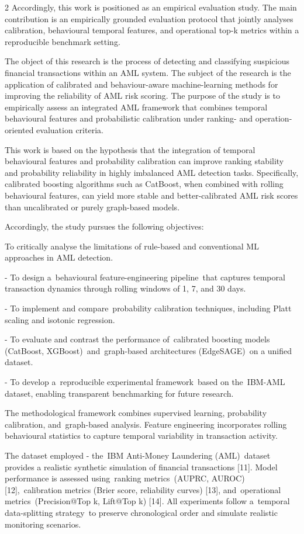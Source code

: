 \begin{multicols}{2}
Accordingly, this work is positioned as an empirical evaluation study.
The main contribution is an empirically grounded evaluation protocol
that jointly analyses calibration, behavioural temporal features, and
operational top-k metrics within a reproducible benchmark setting.

The object of this research is the process of detecting and classifying
suspicious financial transactions within an AML system. The subject of
the research is the application of calibrated and behaviour-aware
machine-learning methods for improving the reliability of AML risk
scoring. The purpose of the study is to empirically assess an integrated
AML framework that combines temporal behavioural features and
probabilistic calibration under ranking- and operation-oriented
evaluation criteria.

This work is based on the hypothesis that the integration of temporal
behavioural features and probability calibration can improve ranking
stability and probability reliability in highly imbalanced AML detection
tasks. Specifically, calibrated boosting algorithms such as CatBoost,
when combined with rolling behavioural features, can yield more stable
and better-calibrated AML risk scores than uncalibrated or purely
graph-based models.

Accordingly, the study pursues the following objectives:

To critically analyse the limitations of rule-based and conventional ML
approaches in AML detection.

- To design a~behavioural feature-engineering pipeline~that captures
temporal transaction dynamics through rolling windows of 1, 7, and 30
days.

- To implement and compare~probability calibration techniques,
including Platt scaling and isotonic regression.

- To evaluate and contrast the performance of~calibrated boosting models
(CatBoost, XGBoost)~and~graph-based architectures
(EdgeSAGE)~on a unified dataset.

- To develop a~reproducible experimental framework~based on the~IBM-AML
dataset, enabling transparent benchmarking for future
research.

The methodological framework combines supervised
learning, probability calibration, and~graph-based analysis.
Feature engineering incorporates rolling behavioural statistics to
capture temporal variability in transaction activity.

The dataset employed - the~IBM Anti-Money Laundering (AML)~dataset
provides a realistic synthetic simulation of financial transactions
{[}11{]}. Model performance is assessed using~ranking metrics~(AUPRC,
AUROC) {[}12{]},~calibration metrics (Brier score, reliability curves)
{[}13{]}, and~operational metrics~(Precision@Top k, Lift@Top k)
{[}14{]}. All experiments follow a~temporal data-splitting strategy~to
preserve chronological order and simulate realistic monitoring
scenarios.


\end{multicols}
